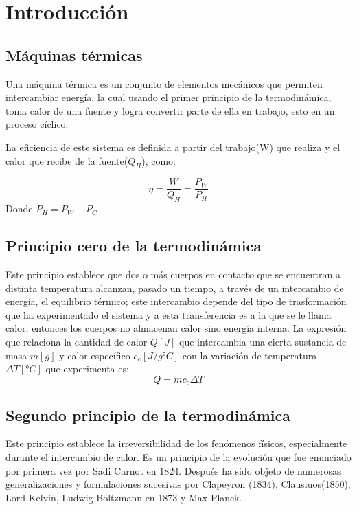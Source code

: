 \section{Introducción}
\subsection{Máquinas térmicas}
Una máquina térmica es un conjunto de elementos mecánicos que permiten intercambiar energía, la cual usando el primer principio de la termodinámica, toma calor de una fuente y logra convertir parte de ella en
trabajo, esto en un proceso cíclico.

La eficiencia de este sistema es definida a partir del trabajo(W) que realiza y el calor que recibe de la fuente($Q_H$), como:

\begin{equation}
    \eta = \frac{W}{Q_H}=\frac{P_W}{P_H}
\end{equation}
Donde $P_H=P_W+P_C$

\subsection{Principio cero de la termodinámica}

Este principio establece que dos o más cuerpos en contacto que se encuentran a distinta temperatura alcanzan, pasado un tiempo, a través de un intercambio de energía, el equilibrio térmico; este intercambio depende del tipo de trasformación que ha experimentado el sistema y a esta transferencia es a la que se le llama calor, entonces los cuerpos no almacenan calor sino energía interna. La expresión que relaciona la cantidad de calor $Q[J]$ que intercambia una cierta sustancia de masa $m[g]$ y calor especíﬁco $c_e[J/g°C]$ con la variación de temperatura $\Delta T[°C]$ que experimenta es:
\begin{equation}
    Q=mc_e\Delta T
\end{equation}

\subsection{Segundo principio de la termodinámica}
Este principio establece la irreversibilidad de los fenómenos físicos, especialmente durante el intercambio de calor. Es un principio de la evolución que fue enunciado por primera vez por Sadi Carnot en 1824. Después ha sido objeto de numerosas generalizaciones y formulaciones sucesivas por Clapeyron (1834), Clausiuos(1850), Lord Kelvin, Ludwig Boltzmann en 1873 y Max Planck.

